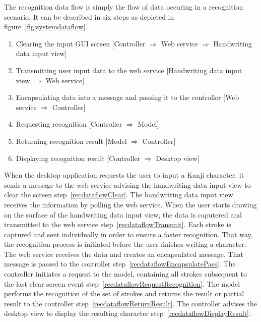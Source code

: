 The recognition data flow is simply the flow of data occuring in a recognition 
scenario. It can be described in six %
steps as depicted in figure~\ref{fig:systemdataflow}.
\begin{enumerate}
  \item \label{recdataflowClear} 
        Clearing the input GUI screen 
        [Controller $\Rightarrow$ Web service $\Rightarrow$ Handwriting data input view]
  \item \label{recdataflowTransmit} 
        Transmitting user input data to the web service 
        [Handwriting data input view $\Rightarrow$ Web service]
  \item \label{recdataflowEncapsulatePass} 
        Encapsulating data into a message and passing 
        it to the controller 
        [Web service $\Rightarrow$ Controller]
  \item \label{recdataflowRequestRecognition} 
        Requesting recognition 
        [Controller $\Rightarrow$ Model] 
  \item \label{recdataflowReturnResult} 
        Returning recognition result 
        [Model $\Rightarrow$ Controller] 
  \item \label{recdataflowDisplayResult} %
        Displaying recognition result 
        [Controller $\Rightarrow$ Desktop view]
\end{enumerate}
When the desktop application requests the user to input a Kanji 
character, it sends a message to the web service advising the handwriting data 
input view to clear the screen step~\ref{recdataflowClear}. 
The handwriting data input view receives the information by polling the web 
service. 
When the user starts drawing on the surface of the handwriting data input view, 
the data is caputered and transmitted to the web service 
step~\ref{recdataflowTransmit}.
Each stroke is captured and sent individually in order to ensure a faster 
recognition. That way, the recognition process is initiated before the
user finishes writing a character. The web service receives the data and 
creates an encapsulated message. That message is passed to the 
controller step~\ref{recdataflowEncapsulatePass}.
The controller initiates a request to the model, containing all strokes
subsequent to the last clear screen 
event step~\ref{recdataflowRequestRecognition}.
The model performs the recognition of the set of strokes and returns the result
or partial result to the controller step~\ref{recdataflowReturnResult}.
The controller advises the desktop view to display the resulting character
step~\ref{recdataflowDisplayResult}.

